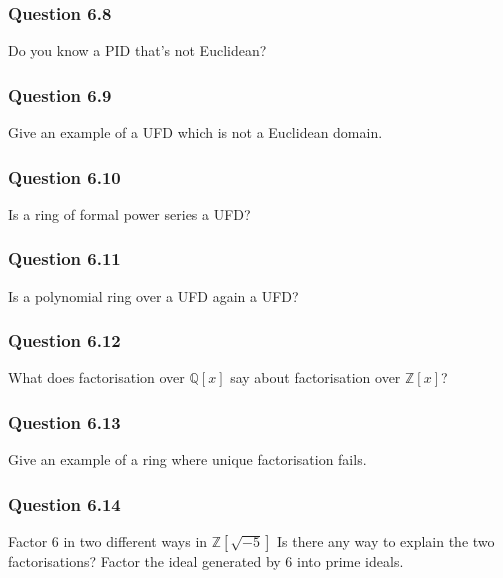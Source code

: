 \hypertarget{question-6.8}{%
\subsubsection{Question 6.8}\label{question-6.8}}

Do you know a PID that's not Euclidean?

\hypertarget{question-6.9}{%
\subsubsection{Question 6.9}\label{question-6.9}}

Give an example of a UFD which is not a Euclidean domain.

\hypertarget{question-6.10}{%
\subsubsection{Question 6.10}\label{question-6.10}}

Is a ring of formal power series a UFD?

\hypertarget{question-6.11}{%
\subsubsection{Question 6.11}\label{question-6.11}}

Is a polynomial ring over a UFD again a UFD?

\hypertarget{question-6.12}{%
\subsubsection{Question 6.12}\label{question-6.12}}

What does factorisation over \({\mathbb{Q}}[x]\) say about factorisation
over \({\mathbb{Z}}[x]\)?

\hypertarget{question-6.13}{%
\subsubsection{Question 6.13}\label{question-6.13}}

Give an example of a ring where unique factorisation fails.

\hypertarget{question-6.14}{%
\subsubsection{Question 6.14}\label{question-6.14}}

Factor 6 in two different ways in \({\mathbb{Z}}[\sqrt{-5}]\) Is there
any way to explain the two factorisations? Factor the ideal generated by
6 into prime ideals.

